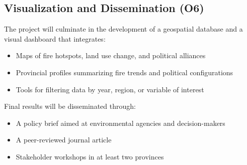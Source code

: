 \subsection{Visualization and Dissemination (O6)}

The project will culminate in the development of a geospatial database and a visual dashboard that integrates:
\begin{itemize}
    \item Maps of fire hotspots, land use change, and political alliances
    \item Provincial profiles summarizing fire trends and political configurations
    \item Tools for filtering data by year, region, or variable of interest
\end{itemize}

Final results will be disseminated through:
\begin{itemize}
    \item A policy brief aimed at environmental agencies and decision-makers
    \item A peer-reviewed journal article
    \item Stakeholder workshops in at least two provinces
\end{itemize}
